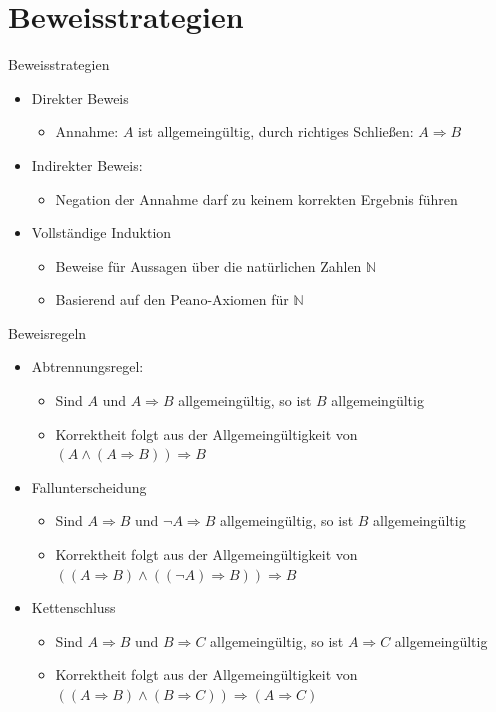 \documentclass[12pt%
,aspectratio=169%
]{beamer}
\begin{document}
\section{Beweisstrategien}
\begin{frame}{Beweisstrategien}
\begin{itemize}
	\item Direkter Beweis
	\begin{itemize}
		\item Annahme: $A$ ist allgemeingültig, durch richtiges Schließen: $A \Rightarrow B$
	\end{itemize}
	\item Indirekter Beweis:
	\begin{itemize}
		\item Negation der Annahme darf zu keinem korrekten Ergebnis führen
	\end{itemize}
	\item Vollständige Induktion
	\begin{itemize}
		\item Beweise für Aussagen über die natürlichen Zahlen $\mathbb{N}$
		\item Basierend auf den Peano-Axiomen für $\mathbb{N}$
	\end{itemize}
\end{itemize}
\end{frame}

\begin{frame}{Beweisregeln}
\begin{itemize}
	\item Abtrennungsregel:
	\begin{itemize}
		\item Sind $A$ und $A \Rightarrow B$ allgemeingültig, so ist $B$ allgemeingültig
		\item Korrektheit folgt aus der Allgemeingültigkeit von $(A \land (A \Rightarrow B)) \Rightarrow B$
	\end{itemize}
	\item Fallunterscheidung
	\begin{itemize}
		\item Sind $A \Rightarrow B$ und $\neg A \Rightarrow B$ allgemeingültig, so ist $B$ allgemeingültig
		\item Korrektheit folgt aus der Allgemeingültigkeit von $((A \Rightarrow B) \land ((\neg A) \Rightarrow B)) \Rightarrow B$
	\end{itemize}
	\item Kettenschluss
	\begin{itemize}
		\item Sind $A \Rightarrow B$ und $B \Rightarrow C$ allgemeingültig, so ist $A \Rightarrow C$ allgemeingültig
		\item Korrektheit folgt aus der Allgemeingültigkeit von $((A \Rightarrow B)\land (B \Rightarrow C)) \Rightarrow (A \Rightarrow C)$
	\end{itemize}
\end{itemize}
\end{frame}
\end{document}
